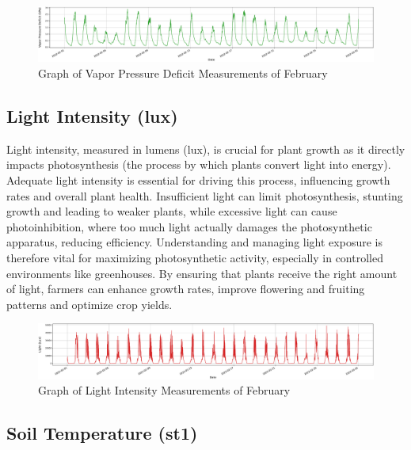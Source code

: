 \begin{figure}[htbp]
    \centering
    \includegraphics[width=15 cm]{4_ChapterMaterials/figuras/train_data_Vapor_Pressure_Deficit.pdf}
    \caption{Graph of Vapor Pressure Deficit Measurements of February}
    \end{figure}

\subsection{Light Intensity (lux)}

Light intensity, measured in lumens (lux), is crucial for plant growth as it directly impacts photosynthesis (the process by which plants convert light into energy). Adequate light intensity is essential for driving this process, influencing growth rates and overall plant health. Insufficient light can limit photosynthesis, stunting growth and leading to weaker plants, while excessive light can cause photoinhibition, where too much light actually damages the photosynthetic apparatus, reducing efficiency. Understanding and managing light exposure is therefore vital for maximizing photosynthetic activity, especially in controlled environments like greenhouses. By ensuring that plants receive the right amount of light, farmers can enhance growth rates, improve flowering and fruiting patterns and optimize crop yields.

\begin{figure}[htbp]
    \centering
    \includegraphics[width=15 cm]{4_ChapterMaterials/figuras/train_data_Light.pdf}
    \caption{Graph of Light Intensity Measurements of February}
    \end{figure}

\subsection{Soil Temperature (st1)}

